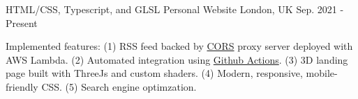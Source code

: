 

\begin{cventries}

  \cventry
    {HTML/CSS, Typescript, and GLSL} %
    {Personal Website} %
    {London, UK} %
    {Sep. 2021 - Present} %
    {
      \begin{cvitems} %
        \item {Implemented features: (1) RSS feed backed by \href{https://developer.mozilla.org/en-US/docs/Web/HTTP/CORS}{CORS} proxy server deployed with AWS Lambda. (2) Automated integration using \href{https://github.com/features/actions}{Github Actions}. (3) 3D landing page built with ThreeJs and custom shaders. (4) Modern, responsive, mobile-friendly CSS. (5) Search engine optimzation.}
      \end{cvitems}
    }



\end{cventries}
